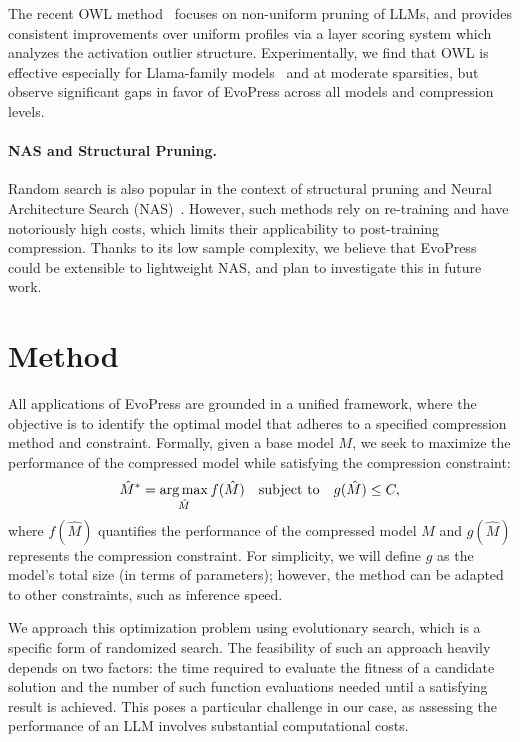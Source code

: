 \documentclass{article}
\theoremstyle{plain}
\theoremstyle{definition}
\theoremstyle{remark}
\newcommand{\methodname}{EvoPress}
\begin{document}
The recent OWL method~\citep{owl} focuses on non-uniform pruning of LLMs, and provides consistent improvements over uniform profiles via a layer scoring system which analyzes the activation outlier structure.
Experimentally, we find that OWL is effective especially for Llama-family models~\citep{touvron2023llama} and at moderate sparsities, but observe significant gaps in favor of \methodname{} across all models and compression levels. 

\paragraph{NAS and Structural Pruning.} 
Random search is also popular in the context of structural pruning and Neural Architecture Search (NAS)~\citep{ijcai2020p341, dong2021efficientbert, wang2020hat, xu2021nasbert, yin2021autotinybert, molchanov2022lana, kurtic2023ziplm}. 
However, such methods rely on re-training and have notoriously high costs, which limits their applicability to post-training compression. 
Thanks to its low sample complexity, we believe that \methodname{} could be extensible to lightweight NAS, and plan to investigate this in future work. 



\section{Method}
\label{sec:method}

All applications of \methodname{} are grounded in a unified framework, where the objective is to identify the optimal model that adheres to a specified compression method and constraint. Formally, given a base model $M$, we seek to maximize the performance of the compressed model while satisfying the compression constraint:
\begin{displaymath}
    \hat{M}^* = \operatorname*{arg\,max}_{\hat{M}} f(\hat{M}) \quad \text{subject to} \quad g(\hat{M}) \leq C,
\end{displaymath}
where $f(\hat{M})$ quantifies the performance of the compressed model $\hat{M}$ and $g(\hat{M})$ represents the compression constraint. For simplicity, we will define $g$ as the model's total size (in terms of parameters); however, the method can be adapted to other constraints, such as inference speed.

We approach this optimization problem using evolutionary search, which is a specific form of randomized search. The feasibility of such an approach heavily depends on two factors: the time required to evaluate the fitness of a candidate solution and the number of such function evaluations needed until a satisfying result is achieved. This poses a particular challenge in our case, as assessing the performance of an LLM involves substantial computational costs. 
\end{document}
